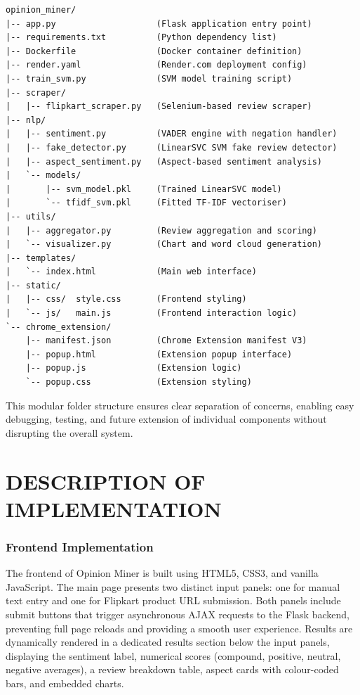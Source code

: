 \documentclass[12pt,a4paper]{report}
\begin{document}
\begin{singlespace}
\begin{lstlisting}
opinion_miner/
|-- app.py                    (Flask application entry point)
|-- requirements.txt          (Python dependency list)
|-- Dockerfile                (Docker container definition)
|-- render.yaml               (Render.com deployment config)
|-- train_svm.py              (SVM model training script)
|-- scraper/
|   |-- flipkart_scraper.py   (Selenium-based review scraper)
|-- nlp/
|   |-- sentiment.py          (VADER engine with negation handler)
|   |-- fake_detector.py      (LinearSVC SVM fake review detector)
|   |-- aspect_sentiment.py   (Aspect-based sentiment analysis)
|   `-- models/
|       |-- svm_model.pkl     (Trained LinearSVC model)
|       `-- tfidf_svm.pkl     (Fitted TF-IDF vectoriser)
|-- utils/
|   |-- aggregator.py         (Review aggregation and scoring)
|   `-- visualizer.py         (Chart and word cloud generation)
|-- templates/
|   `-- index.html            (Main web interface)
|-- static/
|   |-- css/  style.css       (Frontend styling)
|   `-- js/   main.js         (Frontend interaction logic)
`-- chrome_extension/
    |-- manifest.json         (Chrome Extension manifest V3)
    |-- popup.html            (Extension popup interface)
    |-- popup.js              (Extension logic)
    `-- popup.css             (Extension styling)
\end{lstlisting}
\end{singlespace}

This modular folder structure ensures clear separation of concerns, enabling easy debugging, testing, and future extension of individual components without disrupting the overall system.

\section{DESCRIPTION OF IMPLEMENTATION}

\subsubsection*{Frontend Implementation}

The frontend of Opinion Miner is built using HTML5, CSS3, and vanilla JavaScript. The main page presents two distinct input panels: one for manual text entry and one for Flipkart product URL submission. Both panels include submit buttons that trigger asynchronous AJAX requests to the Flask backend, preventing full page reloads and providing a smooth user experience. Results are dynamically rendered in a dedicated results section below the input panels, displaying the sentiment label, numerical scores (compound, positive, neutral, negative averages), a review breakdown table, aspect cards with colour-coded bars, and embedded charts.
\end{document}
